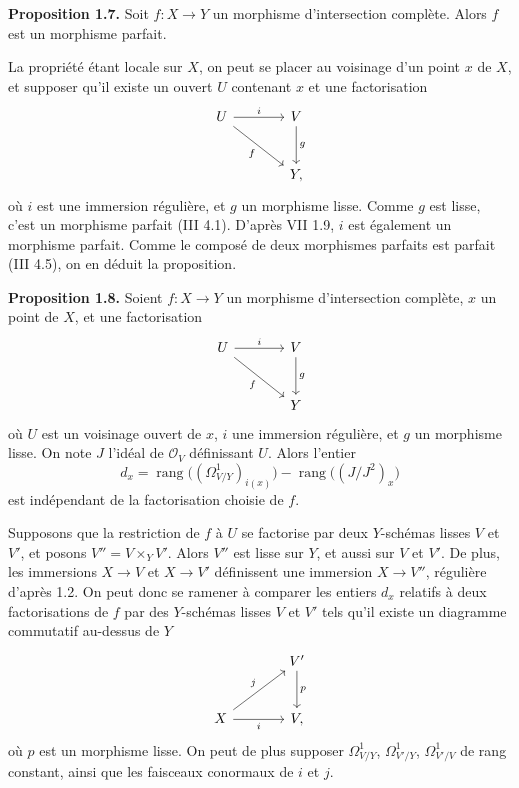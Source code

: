 \documentclass[11pt]{article}
\begin{document}
\textbf{Proposition 1.7.} Soit $f:X\to Y$ un morphisme d'intersection complète. Alors $f$ est un morphisme parfait.

La propriété étant locale sur $X$, on peut se placer au voisinage d'un point $x$ de $X$, et supposer qu'il existe un ouvert $U$ contenant $x$ et une factorisation
\[
\begin{tikzcd}[column sep=large,row sep=large]
U \arrow[r,"i"] \arrow[dr,"f"'] & V \arrow[d,"g"]\\
& Y,
\end{tikzcd}
\]
où $i$ est une immersion régulière, et $g$ un morphisme lisse. Comme $g$ est lisse, c'est un morphisme parfait (III 4.1). D'après VII 1.9, $i$ est également un morphisme parfait. Comme le composé de deux morphismes parfaits est parfait (III 4.5), on en déduit la proposition.

\textbf{Proposition 1.8.} Soient $f:X\to Y$ un morphisme d'intersection complète, $x$ un point de $X$, et une factorisation
\[
\begin{tikzcd}[column sep=large,row sep=large]
U \arrow[r,"i"] \arrow[dr,"f"'] & V \arrow[d,"g"]\\
& Y
\end{tikzcd}
\]
où $U$ est un voisinage ouvert de $x$, $i$ une immersion régulière, et $g$ un morphisme lisse. On note $J$ l'idéal de $\mathcal O_V$ définissant $U$. Alors l'entier
\[
d_x=\operatorname{rang}\bigl((\Omega^1_{V/Y})_{i(x)}\bigr)-\operatorname{rang}\bigl((J/J^2)_x\bigr)
\]
est indépendant de la factorisation choisie de $f$.

Supposons que la restriction de $f$ à $U$ se factorise par deux $Y$-schémas lisses $V$ et $V'$, et posons $V''=V\times_Y V'$. Alors $V''$ est lisse sur $Y$, et aussi sur $V$ et $V'$. De plus, les immersions $X\to V$ et $X\to V'$ définissent une immersion $X\to V''$, régulière d'après 1.2. On peut donc se ramener à comparer les entiers $d_x$ relatifs à deux factorisations de $f$ par des $Y$-schémas lisses $V$ et $V'$ tels qu'il existe un diagramme commutatif au-dessus de $Y$
\[
\begin{tikzcd}[column sep=large,row sep=large]
& V' \arrow[d,"p"]\\
X \arrow[ur,"j"] \arrow[r,"i"'] & V,
\end{tikzcd}
\]
où $p$ est un morphisme lisse. On peut de plus supposer $\Omega^1_{V/Y}$, $\Omega^1_{V'/Y}$, $\Omega^1_{V'/V}$ de rang constant, ainsi que les faisceaux conormaux de $i$ et $j$.
\end{document}
